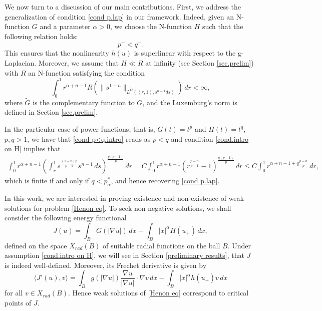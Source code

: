 \documentclass[leqno,twoside, 12pt]{amsart}
\theoremstyle{plain}
\numberwithin{equation}{section} \numberwithin{figure}{section}
\theoremstyle{definition}
\numberwithin{equation}{section}
\begin{document}
We now turn to a discussion of our main contributions. First, we address the generalization of condition \eqref{cond p.lap} in our framework.  Indeed, given an N-function $G$ and a parameter  $\alpha>0$,  we choose the N-function $H$ such that the following relation holds:
\begin{equation}\label{cond p<q.intro}
p^+<q^-.
\end{equation}
This ensures that the nonlinearity $h(u)$ is superlinear with respect to the g-Laplacian. Moreover, we assume that  $H\ll R$ at infinity (see Section \ref{sec.prelim}) with $R$ an N-function satisfying the condition
\begin{equation}\label{cond.intro on H}
\int_0^1 r^{\alpha+n-1} R(  \|s^{1-n}\|_{L^{\widetilde G}((r,1),s^{n-1}ds)})\,dr<\infty, 
\end{equation}
where $\widetilde G$ is the complementary function to $G$, and the Luxemburg's norm is defined in Section \ref{sec.prelim}.


In the particular case of power functions, that is,  $G(t)=t^p$ and $H(t)=t^q$, $p,q>1$, we have
that \eqref{cond p<q.intro} reads as $p<q$ and condition \eqref{cond.intro on H} implies that
\begin{equation*}
\begin{split}
\int_0^1 r^{\alpha+n-1}\left(\int_r^1s^{\frac{(1-n)p}{p-1}}s^{n-1}\,ds \right)^{\frac{q(p-1)}{p}}\,dr = C\int_0^1  r^{\alpha+n-1} \left(r^{\frac{p-n}{p-1}}-1 \right)^{\frac{q(p-1)}{p}}\,dr \leq C\int_0^1  r^{\alpha+n-1 + q\frac{p-n}{p}}\,dr,
\end{split}
\end{equation*}which is finite if and only if $q<p_\alpha^*$, and hence recovering \eqref{cond p.lap}.


\bigskip


In this work, we are interested in proving existence and non-existence of weak solutions for problem \eqref{Henon eq}. To seek non negative solutions, we shall consider the following energy functional
$$
J(u)= \int_B G(|\nabla u|)\,dx -  \int_B |x|^\alpha H( u_{+})\,dx,
$$
defined on the space $X_{rad}(B)$ of suitable radial functions on the ball $B$. Under assumption \eqref{cond.intro on H}, we will see in Section \ref{preliminary results}, that $J$ is indeed well-defined. Moreover, its Frechet derivative is given by
$$
\langle J'(u),v \rangle = \int_B g(|\nabla u|)\frac{\nabla u}{|\nabla u|}\cdot \nabla v\,dx - \int_B  |x|^\alpha h( u_+) v\,dx
$$
for all $v\in X_{rad}(B)$. Hence weak solutions of \eqref{Henon eq} correspond to critical points of $J$. 
\end{document}
